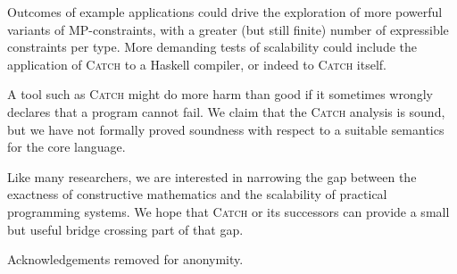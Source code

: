 \documentclass[preprint]{sigplanconf}
\newcommand{\catch}{\textsc{Catch}}
\newcommand{\anon}[2]{#2}
\begin{document}
Outcomes of example applications could drive the exploration of more
powerful variants of MP-constraints, with a greater (but still finite)
number of expressible constraints per type.  More demanding tests of
scalability could include the application of \catch{} to a Haskell compiler,
or indeed to \catch{} itself.

A tool such as \catch{} might do more harm than good if it sometimes wrongly
declares that a program cannot fail.  We claim that the \catch{} analysis
is sound, but we have not formally proved soundness with respect to a
suitable semantics for the core language.

Like many researchers, we are interested in narrowing the gap between the
exactness of constructive mathematics and the scalability of practical
programming systems.  We hope that \catch{} or its successors can provide
a small but useful bridge crossing part of that gap.

\acks
\anon{The first author is an EPSRC-supported PhD student.}{Acknowledgements removed for anonymity.}



\small

\end{document}
